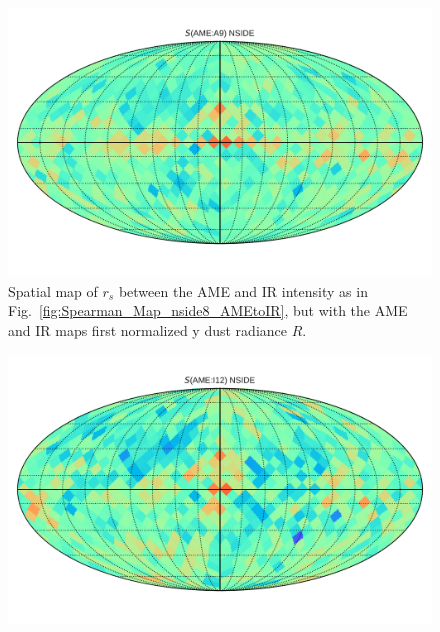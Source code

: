      \begin{figure}
       \includegraphics[width=\textwidth]{../Plots/Allsky_Corr/RadNorm/Spearman_Map_nside8_AMEtoA9.pdf}
       \centering
       \caption{Spatial map of $r_{s}$ between the AME and IR intensity as in Fig.~\ref{fig:Spearman_Map_nside8_AMEtoIR}, but with the AME and IR maps first normalized y dust radiance $R$.}
       \label{fig:Spearman_Map_nside8_AMEtoIR_radnorm_A9}
      \end{figure}
       \begin{figure}
        \includegraphics[width=\textwidth]{../Plots/Allsky_Corr/RadNorm/Spearman_Map_nside8_AMEtoI12.pdf}
        \centering
        \caption{}
        \label{fig:Spearman_Map_nside8_AMEtoIR_radnorm_I12}
      \end{figure}
